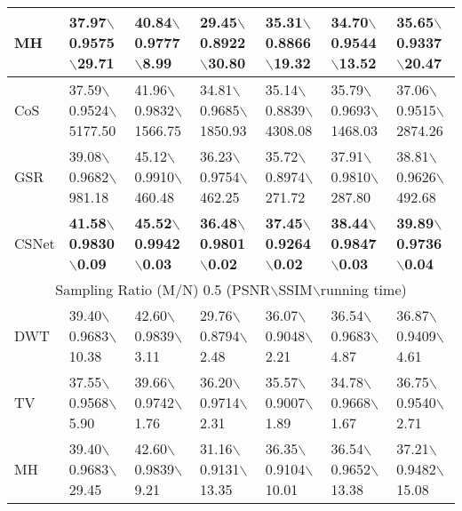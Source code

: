 \documentclass[5pt]{article}
\begin{document}
\begin{table*}[t]
\begin{tabular}{|l|l|l|l|l|l|l|}
\hline
MH & 37.97$\backslash$0.9575$\backslash$29.71 & 40.84$\backslash$0.9777$\backslash$8.99 & 29.45$\backslash$0.8922$\backslash$30.80 & 35.31$\backslash$0.8866$\backslash$19.32 & 34.70$\backslash$0.9544$\backslash$13.52 & 35.65$\backslash$0.9337$\backslash$20.47\\
\hline
CoS & 37.59$\backslash$0.9524$\backslash$\tiny 5177.50 & 41.96$\backslash$0.9832$\backslash$\tiny 1566.75 & 34.81$\backslash$0.9685$\backslash$\tiny 1850.93 & 35.14$\backslash$0.8839$\backslash$\tiny 4308.08 & 35.79$\backslash$0.9693$\backslash$\tiny 1468.03 & 37.06$\backslash$0.9515$\backslash$\tiny 2874.26\\
\hline
GSR & 39.08$\backslash$0.9682$\backslash$981.18 & 45.12$\backslash$0.9910$\backslash$460.48 & 36.23$\backslash$0.9754$\backslash$462.25 & 35.72$\backslash$0.8974$\backslash$271.72 & 37.91$\backslash$0.9810$\backslash$287.80 & 38.81$\backslash$0.9626$\backslash$492.68\\
\hline
CSNet & \textbf{41.58}$\backslash$\textbf{0.9830}$\backslash$\textbf{0.09} & \textbf{45.52}$\backslash$\textbf{0.9942}$\backslash$\textbf{0.03} & \textbf{36.48}$\backslash$\textbf{0.9801}$\backslash$\textbf{0.02} & \textbf{37.45}$\backslash$\textbf{0.9264}$\backslash$\textbf{0.02} & \textbf{38.44}$\backslash$\textbf{0.9847}$\backslash$\textbf{0.03} & \textbf{39.89}$\backslash$\textbf{0.9736}$\backslash$\textbf{0.04}\\
\hline
\multicolumn{7}{|c|}{Sampling Ratio (M/N) 0.5 (PSNR$\backslash$SSIM$\backslash$running time)}\\
\hline
DWT & 39.40$\backslash$0.9683$\backslash$10.38 & 42.60$\backslash$0.9839$\backslash$3.11 & 29.76$\backslash$0.8794$\backslash$2.48 & 36.07$\backslash$0.9048$\backslash$2.21 & 36.54$\backslash$0.9683$\backslash$4.87 & 36.87$\backslash$0.9409$\backslash$4.61\\
\hline
TV & 37.55$\backslash$0.9568$\backslash$5.90 & 39.66$\backslash$0.9742$\backslash$1.76 & 36.20$\backslash$0.9714$\backslash$2.31 & 35.57$\backslash$0.9007$\backslash$1.89 & 34.78$\backslash$0.9668$\backslash$1.67 & 36.75$\backslash$0.9540$\backslash$2.71\\
\hline
MH & 39.40$\backslash$0.9683$\backslash$29.45 & 42.60$\backslash$0.9839$\backslash$9.21 & 31.16$\backslash$0.9131$\backslash$13.35 & 36.35$\backslash$0.9104$\backslash$10.01 & 36.54$\backslash$0.9652$\backslash$13.38 & 37.21$\backslash$0.9482$\backslash$15.08\\

\end{tabular}
\end{table*}
\end{document}
